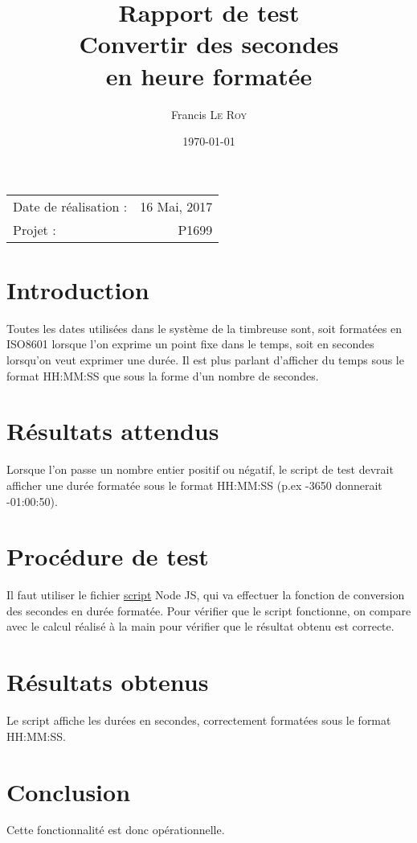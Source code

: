 \documentclass[10pt,a4paper,onecolumn]{article}
\title{Rapport de test \\ Convertir des secondes \\ en heure formatée}
\author{Francis \textsc{Le Roy}}
\date{\today}
\begin{document}
\maketitle
\thispagestyle{fancy}

\begin{center}
\begin{tabular}{l r}
Date de réalisation : & 16 Mai, 2017 \\
Projet : & P1699 \\
\end{tabular}
\end{center}

\section{Introduction}
Toutes les dates utilisées dans le système de la timbreuse sont, soit formatées en ISO8601 lorsque l'on exprime un point fixe dans le temps, soit en secondes lorsqu'on veut exprimer une durée. Il est plus parlant d'afficher du temps sous le format HH:MM:SS que sous la forme d'un nombre de secondes.
\section{Résultats attendus}
Lorsque l'on passe un nombre entier positif ou négatif, le script de test devrait afficher une durée formatée sous le format HH:MM:SS (p.ex -3650 donnerait -01:00:50).
\section{Procédure de test}
Il faut utiliser le fichier \href{run:../../../test/secondsToDateConverter.js}{script} Node JS, qui va effectuer la fonction de conversion des secondes en durée formatée. Pour vérifier que le script fonctionne, on compare avec le calcul réalisé à la main pour vérifier que le résultat obtenu est correcte.
\section{Résultats obtenus}
Le script affiche les durées en secondes, correctement formatées sous le format HH:MM:SS.
\section{Conclusion}
Cette fonctionnalité est donc opérationnelle.
\end{document}
